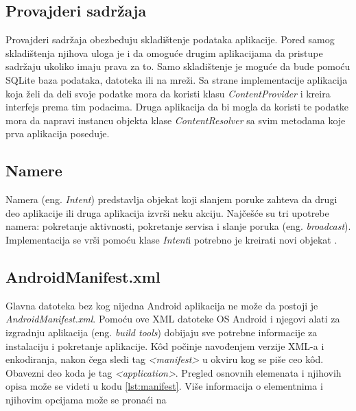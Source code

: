\documentclass[android.tex]{subfiles}
\begin{document}
\subsection{Provajderi sadržaja}
Provajderi sadržaja obezbeđuju skladištenje podataka aplikacije. Pored samog skladištenja njihova uloga je i da omoguće drugim aplikacijama da pristupe sadržaju ukoliko imaju prava za to. Samo skladištenje je moguće da bude pomoću SQLite baza podataka, datoteka ili na mreži. Sa strane implementacije aplikacija koja želi da deli svoje podatke mora da koristi klasu \textit{ContentProvider} i kreira interfejs prema tim podacima. Druga aplikacija da bi mogla da  koristi te podatke mora da napravi instancu objekta klase \textit{ContentResolver} sa svim metodama koje prva aplikacija poseduje. 

\subsection{Namere}
\label{sec:namere}
Namera (eng. \textit{Intent}) predstavlja objekat koji slanjem poruke zahteva da drugi deo aplikacije ili druga aplikacija izvrši neku akciju. Najčešće su tri upotrebe namera: pokretanje aktivnosti, pokretanje servisa i slanje poruka (eng. \textit{broadcast}). Implementacija se vrši pomoću klase \textit{Intent}i potrebno je kreirati novi objekat \cite{sajt:androidDevelopers}. 

\subsection{AndroidManifest.xml}
\label{sec:manifest}
Glavna datoteka bez kog nijedna Android aplikacija ne može da postoji je \textit{AndroidManifest.xml}. Pomoću ove XML datoteke OS Android i njegovi alati za izgradnju aplikacija (eng. \textit{build tools}) dobijaju sve potrebne informacije za instalaciju i pokretanje aplikacije. K\^{o}d počinje navođenjem verzije XML-a i enkodiranja, nakon čega sledi tag \textit{<manifest> }u okviru kog se piše ceo k\^{o}d. Obavezni deo koda je tag \textit{<application>}. Pregled osnovnih elemenata i njihovih opisa može se videti u kodu \ref{lst:manifest}. Više informacija o elementnima i njihovim opcijama može se pronaći na \cite{sajt:manifest}


\end{document}
